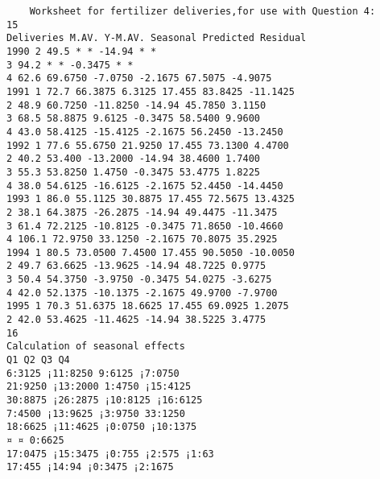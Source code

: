 \documentclass[a4paper,12pt]{article}
\begin{document}
\begin{verbatim}
    Worksheet for fertilizer deliveries,for use with Question 4:
15
Deliveries M.AV. Y-M.AV. Seasonal Predicted Residual
1990 2 49.5 * * -14.94 * *
3 94.2 * * -0.3475 * *
4 62.6 69.6750 -7.0750 -2.1675 67.5075 -4.9075
1991 1 72.7 66.3875 6.3125 17.455 83.8425 -11.1425
2 48.9 60.7250 -11.8250 -14.94 45.7850 3.1150
3 68.5 58.8875 9.6125 -0.3475 58.5400 9.9600
4 43.0 58.4125 -15.4125 -2.1675 56.2450 -13.2450
1992 1 77.6 55.6750 21.9250 17.455 73.1300 4.4700
2 40.2 53.400 -13.2000 -14.94 38.4600 1.7400
3 55.3 53.8250 1.4750 -0.3475 53.4775 1.8225
4 38.0 54.6125 -16.6125 -2.1675 52.4450 -14.4450
1993 1 86.0 55.1125 30.8875 17.455 72.5675 13.4325
2 38.1 64.3875 -26.2875 -14.94 49.4475 -11.3475
3 61.4 72.2125 -10.8125 -0.3475 71.8650 -10.4660
4 106.1 72.9750 33.1250 -2.1675 70.8075 35.2925
1994 1 80.5 73.0500 7.4500 17.455 90.5050 -10.0050
2 49.7 63.6625 -13.9625 -14.94 48.7225 0.9775
3 50.4 54.3750 -3.9750 -0.3475 54.0275 -3.6275
4 42.0 52.1375 -10.1375 -2.1675 49.9700 -7.9700
1995 1 70.3 51.6375 18.6625 17.455 69.0925 1.2075
2 42.0 53.4625 -11.4625 -14.94 38.5225 3.4775
16
Calculation of seasonal effects
Q1 Q2 Q3 Q4
6:3125 ¡11:8250 9:6125 ¡7:0750
21:9250 ¡13:2000 1:4750 ¡15:4125
30:8875 ¡26:2875 ¡10:8125 ¡16:6125
7:4500 ¡13:9625 ¡3:9750 33:1250
18:6625 ¡11:4625 ¡0:0750 ¡10:1375
¤ ¤ 0:6625
17:0475 ¡15:3475 ¡0:755 ¡2:575 ¡1:63
17:455 ¡14:94 ¡0:3475 ¡2:1675
\end{verbatim}
\end{document}
